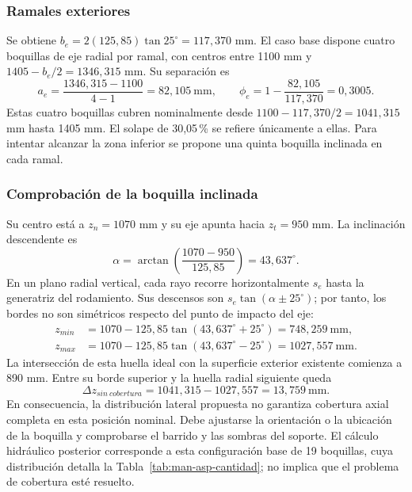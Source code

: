 \subsubsection{Ramales exteriores}
Se obtiene $b_e=2(125{,}85)\tan25^\circ=117{,}370$ mm.
El caso base dispone cuatro boquillas de eje radial por ramal, con centros
entre 1100 mm y $1405-b_e/2=1346{,}315$ mm. Su separación es
\begin{equation}
 a_e=\frac{1346{,}315-1100}{4-1}=82{,}105\ \mathrm{mm},\qquad
 \phi_e=1-\frac{82{,}105}{117{,}370}=0{,}3005.
\end{equation}
Estas cuatro boquillas cubren nominalmente desde
$1100-117{,}370/2=1041{,}315$ mm hasta 1405 mm. El solape de
30,05\,\% se refiere únicamente a ellas. Para intentar alcanzar la zona
inferior se propone una quinta boquilla inclinada en cada ramal.

\subsubsection{Comprobación de la boquilla inclinada}
Su centro está a $z_n=1070$ mm y su eje apunta hacia $z_t=950$ mm.
La inclinación descendente es
\begin{equation}
 \alpha=\arctan\left(\frac{1070-950}{125{,}85}\right)=43{,}637^\circ.
\end{equation}
En un plano radial vertical, cada rayo recorre horizontalmente $s_e$ hasta
la generatriz del rodamiento. Sus descensos son $s_e\tan(\alpha\pm25^\circ)$;
por tanto, los bordes no son simétricos respecto del punto de impacto del eje:
\begin{align}
 z_{min}&=1070-125{,}85\tan(43{,}637^\circ+25^\circ)
 =748{,}259\ \mathrm{mm},\\
 z_{max}&=1070-125{,}85\tan(43{,}637^\circ-25^\circ)
 =1027{,}557\ \mathrm{mm}.
 \label{eq:man-asp-inclinada}
\end{align}
La intersección de esta huella ideal con la superficie exterior existente
comienza a 890 mm. Entre su borde superior y la huella radial siguiente queda
\begin{equation}
 \Delta z_{sin\ cobertura}=1041{,}315-1027{,}557
 =\boxed{13{,}759\ \mathrm{mm}}.
 \label{eq:man-asp-hueco}
\end{equation}
En consecuencia, la distribución lateral propuesta no garantiza cobertura
axial completa en esta posición nominal. Debe ajustarse la orientación o la
ubicación de la boquilla y comprobarse el barrido y las sombras
del soporte. El cálculo hidráulico posterior corresponde a esta configuración
base de 19 boquillas, cuya distribución detalla la
Tabla~\ref{tab:man-asp-cantidad}; no implica que el problema de cobertura esté resuelto.

